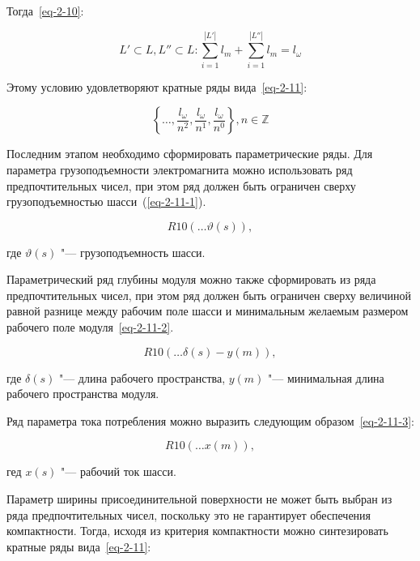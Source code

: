 \noindent Тогда~\cref{eq-2-10}:

\begin{equation}
L' \subset L, L'' \subset L: \sum_{i=1}^{|L'|}l_m + \sum_{i=1}^{|L''|}l_m = l_\omega
\label{eq-2-10}
\end{equation}

Этому условию удовлетворяют кратные ряды вида~\cref{eq-2-11}:

\begin{equation}
\left \{ \ldots, \frac{l_\omega}{n^2}, \frac{l_\omega}{n^1}, \frac{l_\omega}{n^0} \right \}, n \in \mathbb{Z}
\label{eq-2-11}
\end{equation}


Последним этапом необходимо сформировать параметрические ряды. Для параметра грузоподъемности электромагнита можно использовать ряд предпочтительных чисел, при этом ряд должен быть ограничен сверху грузоподъемностью шасси~(\cref{eq-2-11-1}).

\begin{equation}
R10(\ldots \vartheta(s)),
\label{eq-2-11-1}
\end{equation}

\noindent где $\vartheta(s)$ "--- грузоподъемность шасси.


Параметрический ряд глубины модуля можно также сформировать из ряда предпочтительных чисел, при этом ряд должен быть ограничен сверху величиной равной разнице между рабочим поле шасси и минимальным желаемым размером рабочего поле модуля~\cref{eq-2-11-2}.

\begin{equation}
R10(\ldots \delta(s) - y(m)),
\label{eq-2-11-2}
\end{equation}

\noindent где $\delta(s)$ "--- длина рабочего пространства, $y(m)$ "--- минимальная длина рабочего пространства модуля.

Ряд параметра тока потребления можно выразить следующим образом~\cref{eq-2-11-3}:

\begin{equation}
R10(\ldots x(m)),
\label{eq-2-11-3}
\end{equation}
						
\noindent гед $x(s)$ "--- рабочий ток шасси.

Параметр ширины присоединительной поверхности не может быть выбран из  ряда предпочтительных чисел, поскольку это не гарантирует обеспечения компактности. Тогда, исходя из критерия компактности можно синтезировать кратные ряды вида~\cref{eq-2-11}: 


